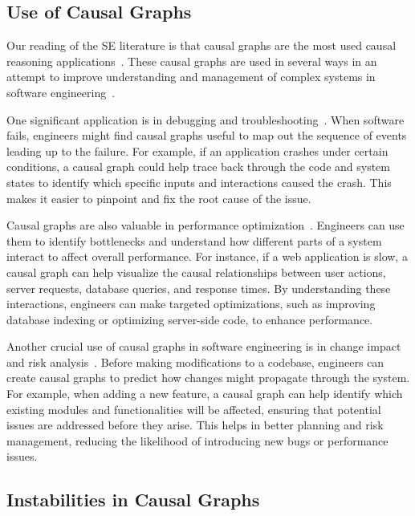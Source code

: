 \subsection{Use of Causal Graphs}

Our reading of the SE literature is that   causal graphs are the most used causal reasoning applications~\cite{10197835}. 
These causal graphs are used in several ways in an attempt to improve understanding and management of complex systems in software engineering~\cite{10197835}. 
 

One significant application is in debugging and troubleshooting~\cite{10.1145/3635709, 10.1145/3377811.3380377}.
When software fails, engineers might find   causal graphs useful to map out the sequence of events leading up to the failure. 
For example, if an application crashes under certain conditions, a causal graph could help trace back through the code and system states to identify which specific inputs and interactions caused the crash. 
This makes it easier to pinpoint and fix the root cause of the issue. 
 


Causal graphs are also valuable in performance optimization~\cite{10.1007/978-3-030-59152-6_19, 10.1145/3492321.3519575, wu2019employing}. 
Engineers can use them to identify bottlenecks and understand how different parts of a system interact to affect overall performance. 
For instance, if a web application is slow, a causal graph can help visualize the causal relationships between user actions, server requests, database queries, and response times. 
By understanding these interactions, engineers can make targeted optimizations, such as improving database indexing or optimizing server-side code, to enhance performance.

Another crucial use of causal graphs in software engineering is in change impact and risk analysis~\cite{HU2013439}. 
Before making modifications to a codebase, engineers can create causal graphs to predict how changes might propagate through the system. 
For example, when adding a new feature, a causal graph can help identify which existing modules and functionalities will be affected, ensuring that potential issues are addressed before they arise. 
This helps in better planning and risk management, reducing the likelihood of introducing new bugs or performance issues.
 
\subsection{Instabilities in Causal Graphs}

